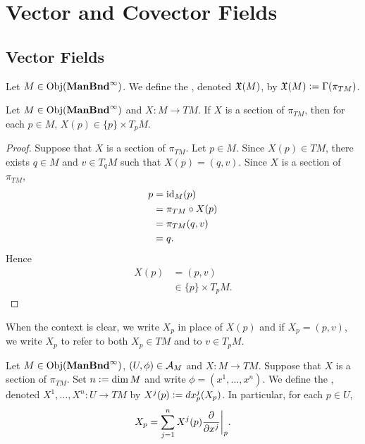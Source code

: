 \documentclass{book}
\begin{document}
\newpage
\chapter{Vector and Covector Fields}

\section{Vector Fields}

\begin{defn}
	Let $M \in \operatorname{Obj}(\operatorname*{\text{\textbf{ManBnd}}^{\infty}})$. We define the , denoted $\mathfrak{X}(M)$, by $\mathfrak{X}(M) \vcentcolon= \Gamma(\pi_{TM})$. 
\end{defn}

\begin{ex}
	Let $M \in \operatorname{Obj}(\operatorname*{\text{\textbf{ManBnd}}^{\infty}})$ and $X: M \rightarrow TM$. If $X$ is a section of $\pi_{TM}$, then for each $p \in M$, $X(p) \in \{p\} \times T_p M$.
\end{ex}

\begin{proof}
	Suppose that $X$ is a section of $\pi_{TM}$. Let $p \in M$. Since $X(p) \in TM$, there exists $q \in M$ and $v \in T_qM$ such that $X(p) = (q, v)$. Since $X$ is a section of $\pi_{TM}$, 
	\begin{align*}
		p
		& = \operatorname{id}_M(p) \\
		& = \pi_{TM} \circ X(p) \\
		& = \pi_{TM} (q, v) \\
		& = q.
	\end{align*}
	Hence 
	\begin{align*}
		X(p) 
		& = (p, v) \\
		& \in \{p\} \times T_pM.
	\end{align*}
\end{proof}

\begin{note}
	When the context is clear, we write $X_p$ in place of $X(p)$ and if $X_p = (p, v)$, we write $X_p$ to refer to both $X_p \in TM$ and to $v \in T_pM$.
\end{note}

\begin{defn}
	Let $M \in \operatorname{Obj}(\operatorname*{\text{\textbf{ManBnd}}^{\infty}})$, $(U, \phi) \in \mathcal{A}_M$ and $X: M \rightarrow TM$. Suppose that $X$ is a section of $\pi_{TM}$. Set $n \vcentcolon= \dim M$ and write $\phi = (x^1, \ldots, x^n)$. We define the , denoted $X^1, \ldots, X^n:U \rightarrow TM$ by $X^j(p) \vcentcolon= dx^j_p(X_p)$. In particular, for each $p \in U$, 
	$$X_p = \sum\limits_{j=1}^n X^j(p) \frac{\partial}{\partial x^j} \bigg|_p.$$ 
\end{defn}
\end{document}

